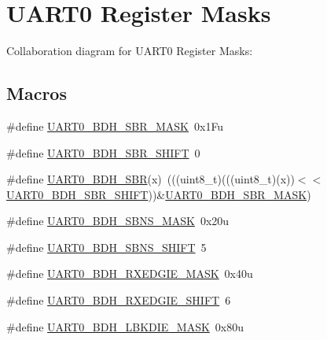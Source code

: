 \hypertarget{group___u_a_r_t0___register___masks}{}\section{U\+A\+R\+T0 Register Masks}
\label{group___u_a_r_t0___register___masks}
Collaboration diagram for U\+A\+R\+T0 Register Masks\+:
\subsection*{Macros}
\begin{DoxyCompactItemize}
\item 
\#define \hyperlink{group___u_a_r_t0___register___masks_ga594b77e6abc9054650d85c9d7e2c4cfa}{U\+A\+R\+T0\+\_\+\+B\+D\+H\+\_\+\+S\+B\+R\+\_\+\+M\+A\+SK}~0x1\+Fu
\item 
\#define \hyperlink{group___u_a_r_t0___register___masks_ga5262e2ab11a18782a8cceb9a63affe27}{U\+A\+R\+T0\+\_\+\+B\+D\+H\+\_\+\+S\+B\+R\+\_\+\+S\+H\+I\+FT}~0
\item 
\#define \hyperlink{group___u_a_r_t0___register___masks_gaaab64986eac86f67040cce306b41e610}{U\+A\+R\+T0\+\_\+\+B\+D\+H\+\_\+\+S\+BR}(x)~(((uint8\+\_\+t)(((uint8\+\_\+t)(x))$<$$<$\hyperlink{group___u_a_r_t0___register___masks_ga5262e2ab11a18782a8cceb9a63affe27}{U\+A\+R\+T0\+\_\+\+B\+D\+H\+\_\+\+S\+B\+R\+\_\+\+S\+H\+I\+FT}))\&\hyperlink{group___u_a_r_t0___register___masks_ga594b77e6abc9054650d85c9d7e2c4cfa}{U\+A\+R\+T0\+\_\+\+B\+D\+H\+\_\+\+S\+B\+R\+\_\+\+M\+A\+SK})
\item 
\#define \hyperlink{group___u_a_r_t0___register___masks_gaed905f161d823efa3beca3e0e93d39ff}{U\+A\+R\+T0\+\_\+\+B\+D\+H\+\_\+\+S\+B\+N\+S\+\_\+\+M\+A\+SK}~0x20u
\item 
\#define \hyperlink{group___u_a_r_t0___register___masks_gad8909b0c50ce1d7436a2bdb2d99cce1a}{U\+A\+R\+T0\+\_\+\+B\+D\+H\+\_\+\+S\+B\+N\+S\+\_\+\+S\+H\+I\+FT}~5
\item 
\#define \hyperlink{group___u_a_r_t0___register___masks_ga345980eca350a190e8fc3e39109a0eea}{U\+A\+R\+T0\+\_\+\+B\+D\+H\+\_\+\+R\+X\+E\+D\+G\+I\+E\+\_\+\+M\+A\+SK}~0x40u
\item 
\#define \hyperlink{group___u_a_r_t0___register___masks_gad8f5143553887979638377da46673dfc}{U\+A\+R\+T0\+\_\+\+B\+D\+H\+\_\+\+R\+X\+E\+D\+G\+I\+E\+\_\+\+S\+H\+I\+FT}~6
\item 
\#define \hyperlink{group___u_a_r_t0___register___masks_ga84132309b565d272671dde5d912a1611}{U\+A\+R\+T0\+\_\+\+B\+D\+H\+\_\+\+L\+B\+K\+D\+I\+E\+\_\+\+M\+A\+SK}~0x80u
$$
\end{DoxyCompactItemize}
